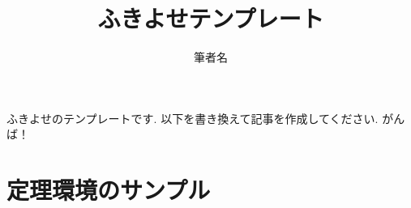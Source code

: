 \newcommand{\Map}{\mathop{\mathrm{Map}}\nolimits}
\newcommand{\Hom}{\mathop{\mathrm{Hom}}\nolimits}
\newcommand{\End}{\mathop{\mathrm{End}}\nolimits}
\newcommand{\Aut}{\mathop{\mathrm{Aut}}\nolimits}
\newcommand{\Mor}{\mathop{\mathrm{Mor}}\nolimits}

\newcommand{\dip}{\displaystyle} %
\newcommand{\e}{\varepsilon} %
\newcommand{\dl}{\delta} %
\newcommand{\pphi}{\varphi} %
\newcommand{\ti}{\tilde} %
\newcommand{\pal}{\parallel} %
\newcommand{\op}{{\rm op}} %
\newcommand{\lcm}{\mathop{\mathrm{lcm}}\nolimits} %
\newcommand{\Probsp}{(\Omega, \F, \P)} 
\newcommand{\argmax}{\mathop{\rm arg~max}\limits}
\newcommand{\argmin}{\mathop{\rm arg~min}\limits}












\def\inner<#1>{\langle #1 \rangle}








\title{ふきよせテンプレート}
\author{筆者名}
\date{}

\maketitle

ふきよせのテンプレートです. 
以下を書き換えて記事を作成してください. 
がんば！

\section{定理環境のサンプル}

